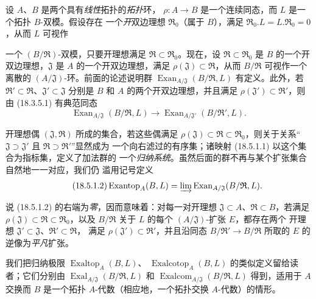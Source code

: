 \begin{env}[18.5.1]
\label{0.18.5.1-fr}
设 $A$、$B$ 是两个具有\emph{线性}拓扑的\emph{拓扑}环，
$\rho:A\to B$ 是一个连续同态，而 $L$ 是一个拓扑 $B$-双模。假设存在
一个\emph{开}双边理想 $\mathfrak R_0$（属于 $B$），满足
$\mathfrak R_0.L=L.\mathfrak R_0=0$，从而 $L$ 可视作


一个 $(B/\mathfrak R)$-双模，只要开理想满足
$\mathfrak R\subset\mathfrak R_0$。现在，设
$\mathfrak R\subset\mathfrak R_0$ 是 $B$ 的一个开双边理想，$\mathfrak J$ 是
$A$ 的一个开双边理想，满足 $\rho(\mathfrak J)\subset\mathfrak R$，从而
$B/\mathfrak R$ 可视作一个离散的 $(A/\mathfrak J)$-环。前面的论述说明群
$\operatorname{Exan}_{A/\mathfrak J}(B/\mathfrak R,L)$ 有定义。此外，若
$\mathfrak R'\subset\mathfrak R$、$\mathfrak J'\subset\mathfrak J$ 分别是
$B$ 和 $A$ 的两个开双边理想，并且满足
$\rho(\mathfrak J')\subset\mathfrak R'$，则由 (18.3.5.1) 有典范同态
\begin{equation}
\label{0.18.5.1.1-fr}
\tag{18.5.1.1}
  \operatorname{Exan}_{A/\mathfrak J}(B/\mathfrak R,L)
  \longrightarrow
  \operatorname{Exan}_{A/\mathfrak J'}(B/\mathfrak R',L).
\end{equation}

开理想偶 $(\mathfrak J,\mathfrak R)$ 所成的集合，若这些偶满足
$\rho(\mathfrak J)\subset\mathfrak R\subset\mathfrak R_0$，则关于关系“
$\mathfrak J\supset\mathfrak J'$ 且 $\mathfrak R\supset\mathfrak R'$”显然成为
一个向右滤过的有序集；诸映射 (18.5.1.1) 以这个集合为指标集，定义了加法群的
一个\emph{归纳系统}。虽然后面的群不再与某个扩张集合自然地一一对应，我们仍
滥用记号定义
\begin{equation}
\label{0.18.5.1.2-fr}
\tag{18.5.1.2}
  \operatorname{Exantop}_A(B,L)
  =\varinjlim\operatorname{Exan}_{A/\mathfrak J}(B/\mathfrak R,L).
\end{equation}

说 (18.5.1.2) 的右端为\emph{零}，因而意味着：对每一对开理想
$\mathfrak J\subset A$、$\mathfrak R\subset B$，若满足
$\rho(\mathfrak J)\subset\mathfrak R\subset\mathfrak R_0$，以及 $B/\mathfrak R$ 关于
$L$ 的每个 $(A/\mathfrak J)$-扩张 $E$，都存在两个
开理想 $\mathfrak J'\subset\mathfrak J$、$\mathfrak R'\subset\mathfrak R$，
满足 $\rho(\mathfrak J')\subset\mathfrak R'$，并且沿同态
$B/\mathfrak R'\to B/\mathfrak R$ 所取的 $E$ 的逆像为\emph{平凡}扩张。

我们把归纳极限 $\operatorname{Exaltop}_A(B,L)$、
$\operatorname{Exalcotop}_A(B,L)$ 的类似定义留给读者；它们分别由
$\operatorname{Exal}_{A/\mathfrak J}(B/\mathfrak R,L)$ 和
$\operatorname{Exalcom}_{A/\mathfrak J}(B/\mathfrak R,L)$ 得到，适用于 $A$
交换而 $B$ 是一个拓扑 $A$-代数（相应地，一个拓扑交换 $A$-代数）的情形。
\end{env}

